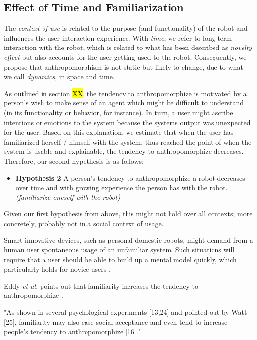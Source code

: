 \documentclass{frontiersSCNS} %
\begin{document}
\subsection{Effect of Time and Familiarization}

The \textit{context of use} is related to the purpose (and functionality) of the
robot and influences the user interaction experience. With \textit{time}, we
refer to long-term interaction with the robot, which is related to what has been
described as \textit{novelty effect} but also accounts for the user getting used
to the robot. Consequently, we propose that anthropomorphism is not static but
likely to change, due to what we call \textit{dynamics}, in space and time.


As outlined in section \hl{XX}, the tendency to anthropomorphize is motivated by
a person's wish to make sense of an agent which might be difficult to understand
(in its functionality or behavior, for instance). In turn, a user might ascribe
intentions or emotions to the system because the systems output was unexpected
for the user. Based on this explanation, we estimate that when the user has
familiarized herself / himself with the system, thus reached the point of when
the system is usable and explainable, the tendency to anthropomorphize
decreases. Therefore, our second hypothesis is as follows: 

\begin{itemize}
	\item \textbf{Hypothesis 2} A person's tendency to anthropomorphize a robot decreases over time and with growing experience the person has with the robot. \textit{(familiarize oneself with the robot)}
\end{itemize}	
	

Given our first hypothesis from above, this might not hold over all contexts;
more concretely, probably not in a social context of usage.


Smart innovative devices, such as personal domestic robots, might demand from a
human user spontaneous usage of an unfamiliar system. Such situations will
require that a user should be able to build up a mental model quickly, which
particularly holds for novice users \cite{schmitz_concepts_2011}.

Eddy \textit{et al.} points out that familiarity increases the tendency to
anthropomorphize \cite{eddy_attribution_1993}.

"As shown in several psychological experiments [13,24] and pointed out by Watt
[25], familiarity may also ease social acceptance and even tend to increase
people's tendency to anthropomorphize [16]." \cite{duffy_anthropomorphism_2003}
\end{document}
